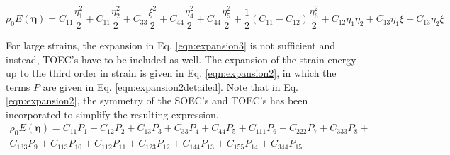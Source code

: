 \documentclass[showpacs,aps,floatfix,prb,reprint,superscriptaddress,onecolumn]{revtex4-1}
\begin{document}
\begin{equation}
\label{eqn:expansion3} 
\rho_{0} E \left(\bm{\eta}\right) = C_{11}\frac{\eta_{1}^2}{2} + C_{11}\frac{\eta_{2}^2}{2} +  C_{33}\frac{\xi^2}{2} + C_{44}\frac{\eta_{4}^2}{2} + C_{44}\frac{\eta_{5}^2}{2} + \frac{1}{2} \left(C_{11}-C_{12}\right)\frac{\eta_{6}^2}{2} + C_{12}\eta_{1}\eta_{2} + C_{13}\eta_{1}\xi + C_{13}\eta_{2}\xi
\end{equation}

For large strains, the expansion in Eq. \ref{eqn:expansion3} is not sufficient and instead, TOEC's have to be included as well. The expansion of the strain energy up to the third order in strain is given in Eq. \ref{eqn:expansion2}, in which the terms $P$ are given in Eq. \ref{eqn:expansion2detailed}. Note that in Eq. \ref{eqn:expansion2}, the symmetry of the SOEC's and TOEC's has been incorporated to simplify the resulting expression. 
\begin{multline}
\label{eqn:expansion2} 
\rho_{0} E \left(\bm{\eta}\right) = C_{11} P_{1} +  C_{12} P_{2} + C_{13} P_{3} + C_{33} P_{4} + C_{44} P_{5} + C_{111} P_{6} + C_{222} P_{7} + C_{333} P_{8} + \\ C_{133} P_{9} +  C_{113} P_{10} + C_{112} P_{11} + C_{123} P_{12} + C_{144} P_{13} + C_{155} P_{14} + C_{344} P_{15}
\end{multline}
\end{document}
